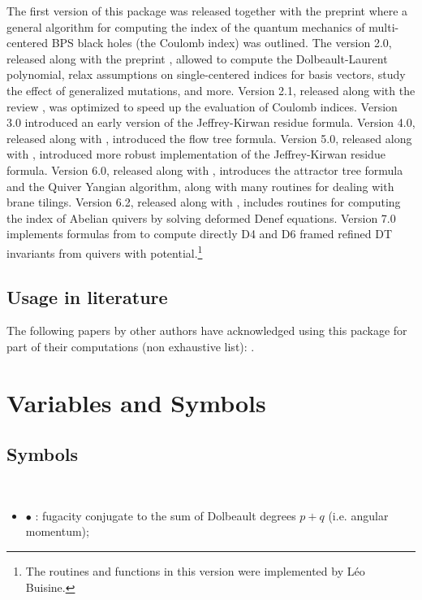 \documentclass[12pt]{JHEP3}
\newcommand{\defvar}[2]{~\\[-30pt]\begin{itemize}\item[]\indent\hspace{-21pt}$\bullet$\hspace{-.75pt} \var{#1}: #2\end{itemize}\vspace{-10pt}}
\newcommand{\var}[1]{{\tt{\color{varcolor}{\tt #1}}}}
\begin{document}
The first version of this package was released together with the preprint \cite{Manschot:2013sya} where a general algorithm for computing the index of the quantum mechanics of multi-centered BPS black holes (the Coulomb index) was outlined. The version 2.0, released along with the preprint \cite{Manschot:2012rx}, allowed to compute the Dolbeault-Laurent polynomial, relax assumptions on single-centered indices for basis vectors, study the effect of generalized mutations, and more. Version 2.1, released along with the review \cite{Manschot:2014fua}, was optimized to speed up the evaluation of Coulomb indices.  Version 3.0 introduced 
an early version of the Jeffrey-Kirwan residue formula. Version 4.0, released along with \cite{Alexandrov:2018iao}, introduced  the flow tree formula. Version 5.0, released along with \cite{Beaujard:2019pkn},
introduced  more robust implementation of the Jeffrey-Kirwan residue formula.
Version 6.0, released along with \cite{BPMozgovoy}, introduces the attractor tree formula and the Quiver Yangian algorithm, along with many routines for dealing with brane tilings. 
Version 6.2, released along with \cite{Beaujard:2021fsk}, includes routines for computing the index of Abelian quivers by solving deformed
Denef equations. Version 7.0 implements formulas from \cite{Descombes:2021snc} to compute directly D4 and D6 framed refined DT invariants from quivers with potential.\footnote{The routines and functions in this version were implemented by Léo Buisine.} 



\subsection{Usage in literature}
The following papers by other authors have acknowledged using this package for part of their computations (non exhaustive list): 
\cite{Cordova:2013bza,Gaddam:2016xum,Messamah:2020ldn,Duan:2020qjy,Banerjee:2020moh,Longhi:2021qvz}.



\section{Variables and Symbols}

\subsection{Symbols}
 
\defvar{y}{fugacity conjugate to the sum of Dolbeault degrees $p+q$ (i.e. angular momentum);}
\end{document}
